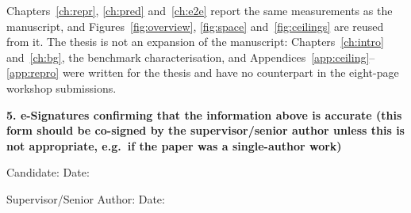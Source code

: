 {\noindent
Chapters~\ref{ch:repr}, \ref{ch:pred} and~\ref{ch:e2e} report the same
measurements as the manuscript, and Figures~\ref{fig:overview},
\ref{fig:space} and~\ref{fig:ceilings} are reused from it. The thesis is not an
expansion of the manuscript: Chapters~\ref{ch:intro} and~\ref{ch:bg}, the
benchmark characterisation, and Appendices~\ref{app:ceiling}--\ref{app:repro}
were written for the thesis and have no counterpart in the eight-page workshop
submissions.

\vspace{0.5cm}

\noindent\textbf{5. e-Signatures confirming that the information above is
accurate (this form should be co-signed by the supervisor/senior author unless
this is not appropriate, e.g.\ if the paper was a single-author work)}

\vspace{0.6cm}

\noindent Candidate: \authorName \hfill Date: \submissionDate

\vspace{1.1cm}

\noindent Supervisor/Senior Author: \primarySupervisor \hfill Date:

\vspace{0.4cm}
\thispagestyle{rpdf}
}
